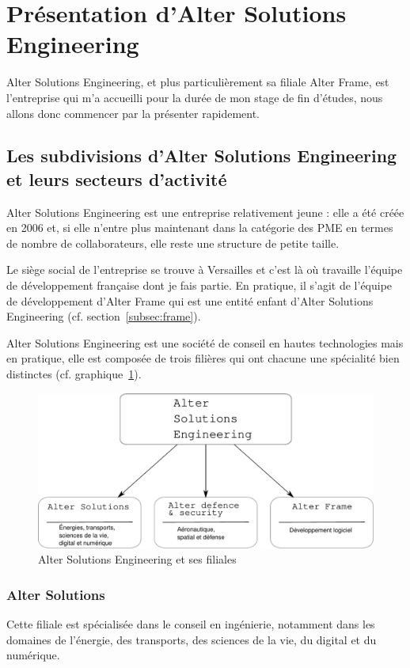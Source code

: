 \section{Présentation d'Alter Solutions Engineering} 
Alter Solutions Engineering, et plus particulièrement sa filiale Alter Frame, est l'entreprise qui m'a accueilli pour la durée de mon stage de fin d'études, nous allons donc commencer par la présenter rapidement.

\subsection{Les subdivisions d'Alter Solutions Engineering et leurs secteurs d'activité}
Alter Solutions Engineering est une entreprise relativement jeune : elle a été créée en 2006 et, si elle n'entre plus maintenant dans la catégorie des PME en termes de nombre de collaborateurs, elle reste une structure de petite taille.

Le siège social de l'entreprise se trouve à Versailles et c'est là où travaille l'équipe de développement française dont je fais partie. En pratique, il s'agit de l'équipe de développement d'Alter Frame qui est une entité enfant d'Alter Solutions Engineering (cf. section~\ref{subsec:frame}).

Alter Solutions Engineering est une société de conseil en hautes technologies mais en pratique, elle est composée de trois filières qui ont chacune une spécialité bien distinctes (cf. graphique~\ref{fig:filiales}).
\begin{figure}
  \centering
  \caption{Alter Solutions Engineering et ses filiales}
  \label{fig:filiales}
  \includegraphics[width=\textwidth]{images/filiales_allinone.pdf}
\end{figure}

\subsubsection{Alter Solutions}
Cette filiale est spécialisée dans le conseil en ingénierie, notamment dans les domaines de l'énergie, des transports, des sciences de la vie, du digital et du numérique.

